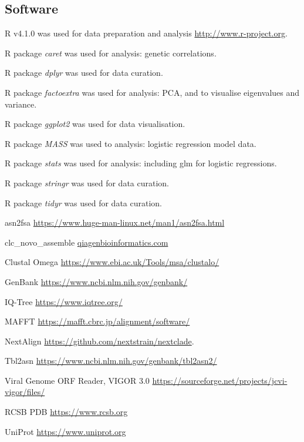 \documentclass{article}
\begin{document}
\subsection{Software}
\begin{description}[noitemsep]

\item R v4.1.0 was used for data preparation and analysis \url{http://www.r-project.org}.
\item R package \textit{caret} was used for analysis: genetic correlations.
\item R package \textit{dplyr} was used for data curation.
\item R package \textit{factoextra} was used for analysis: PCA, and to visualise eigenvalues and variance.
\item R package \textit{ggplot2} was used for data visualisation.
\item R package \textit{MASS} was used to analysis: logistic regression model data.
\item R package \textit{stats} was used for analysis: including glm for logistic regressions. 
\item R package \textit{stringr} was used for data curation.
\item R package \textit{tidyr} was used for data curation.
\item asn2fsa \url{https://www.huge-man-linux.net/man1/asn2fsa.html}
\item clc\_novo\_assemble \href{https://resources.qiagenbioinformatics.com/manuals
/clcgenomicsworkbench/852/index.php?manual=De_novo_assembly.html}{qiagenbioinformatics.com} \
\item Clustal Omega \url{https://www.ebi.ac.uk/Tools/msa/clustalo/}
\item GenBank \url{https://www.ncbi.nlm.nih.gov/genbank/}
\item IQ-Tree \url{https://www.iqtree.org/}
\item MAFFT \url{https://mafft.cbrc.jp/alignment/software/} \cite{katoh2013mafft}
\item  NextAlign \href{https://github.com/nextstrain/nextclade}{https://github.com/nextstrain/nextclade}.
\item Tbl2asn \url{https://www.ncbi.nlm.nih.gov/genbank/tbl2asn2/}
\item Viral Genome ORF Reader, VIGOR 3.0 \url{https://sourceforge.net/projects/jcvi-vigor/files/}
\item RCSB PDB	\url{https://www.rcsb.org}
\item UniProt	\url{https://www.uniprot.org}

\end{description}
\end{document}
